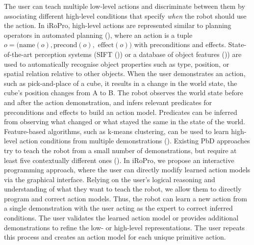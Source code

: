 The user can teach multiple low-level actions and discriminate between them by associating different high-level conditions that specify \textit{when} the robot should use the action. %
In iRoPro, high-level actions are represented similar to planning operators in automated planning (), where an action is a tuple $o = (\text{name}(o), \text{precond}(o),$ $\text{effect}(o))$ with preconditions and effects.
State-of-the-art perception systems (\eg SIFT (\cite{ahmadzadeh2015learning})) or a database of object features (\cite{mason2011robot})) are used to automatically recognise object properties such as type, position, or spatial relation relative to other objects.
When the user demonstrates an action, such as pick-and-place of a cube, %
it results in a change in the world state, \eg the cube's position changes from A to B.
The robot observes the world state before and after the action demonstration, and infers relevant predicates for preconditions and effects to build an action model. %
Predicates can be inferred from observing what changed or what stayed the same in the state of the world.
Feature-based algorithms, such as k-means clustering, can be used to learn high-level action conditions from multiple demonstrations (\cite{mollard2015robot,abdo2013learning}).
Existing PbD approaches try to teach the robot from a small number of demonstrations, but require at least five contextually different ones (\cite{orendt2016robot,abdo2013learning}).
In iRoPro, we propose an interactive programming approach, where the user can directly modify learned action models via the graphical interface.
Relying on the user's logical reasoning and understanding of what they want to teach the robot, we allow them to directly program and correct action models.
Thus, the robot can learn a new action from a single demonstration with the user acting as the expert to correct inferred conditions.
The user validates the learned action model or provides additional demonstrations to refine the low- or high-level representations.
The user repeats this process and creates an action model for each unique primitive action.

